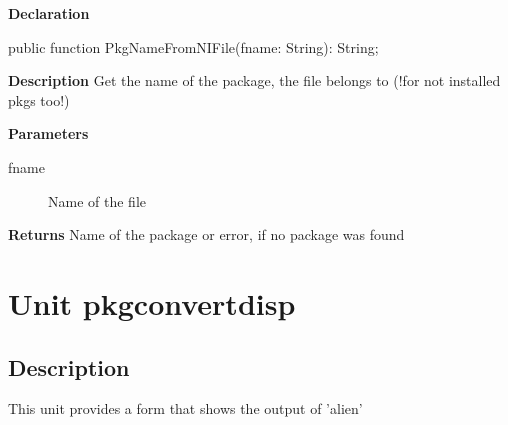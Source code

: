 \documentclass{report}
\newif\ifpdf
\begin{document}
\label{packagekit.TPackageKit-PkgNameFromNIFile}
\begin{list}{}{
\setlength{\itemindent}{0cm}
\setlength{\listparindent}{0cm}
\setlength{\leftmargin}{\evensidemargin}
\addtolength{\leftmargin}{\tmplength}
\settowidth{\labelsep}{X}
\addtolength{\leftmargin}{\labelsep}
\setlength{\labelwidth}{\tmplength}
}
\item[\textbf{Declaration}\hfill]
\ifpdf
\begin{flushleft}
\fi
\begin{ttfamily}
public function PkgNameFromNIFile(fname: String): String;\end{ttfamily}

\ifpdf
\end{flushleft}
\fi

\par
\item[\textbf{Description}]
Get the name of the package, the file belongs to (!for not installed pkgs too!)  \par
\item[\textbf{Parameters}]
\begin{description}
\item[fname] Name of the file
\end{description}
\item[\textbf{Returns}]Name of the package or error, if no package was found


\end{list}
\chapter{Unit pkgconvertdisp}
\label{pkgconvertdisp}
\section{Description}
This unit provides a form that shows the output of 'alien'
\end{document}
